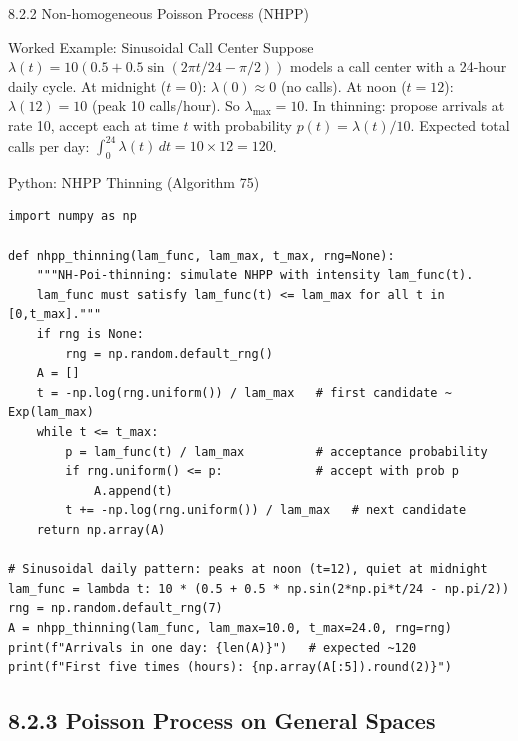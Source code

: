 \documentclass[aspectratio=169,10pt]{beamer}
\begin{document}
\begin{frame}[allowframebreaks]{8.2.2 Non-homogeneous Poisson Process (NHPP)}
\begin{exampleblock}{Worked Example: Sinusoidal Call Center}
Suppose $\lambda(t) = 10(0.5 + 0.5\sin(2\pi t/24 - \pi/2))$ models a call
center with a 24-hour daily cycle.  At midnight ($t=0$): $\lambda(0) \approx 0$
(no calls).  At noon ($t=12$): $\lambda(12) = 10$ (peak 10 calls/hour).  So
$\lambda_{\max} = 10$.  In thinning: propose arrivals at rate 10, accept each at
time $t$ with probability $p(t) = \lambda(t)/10$.  Expected total calls per day:
$\int_0^{24}\lambda(t)\,dt = 10 \times 12 = 120$.
\end{exampleblock}

\end{frame}

\begin{frame}[fragile]{Python: NHPP Thinning (Algorithm 75)}
\begin{lstlisting}[style=python]
import numpy as np

def nhpp_thinning(lam_func, lam_max, t_max, rng=None):
    """NH-Poi-thinning: simulate NHPP with intensity lam_func(t).
    lam_func must satisfy lam_func(t) <= lam_max for all t in [0,t_max]."""
    if rng is None:
        rng = np.random.default_rng()
    A = []
    t = -np.log(rng.uniform()) / lam_max   # first candidate ~ Exp(lam_max)
    while t <= t_max:
        p = lam_func(t) / lam_max          # acceptance probability
        if rng.uniform() <= p:             # accept with prob p
            A.append(t)
        t += -np.log(rng.uniform()) / lam_max   # next candidate
    return np.array(A)

# Sinusoidal daily pattern: peaks at noon (t=12), quiet at midnight
lam_func = lambda t: 10 * (0.5 + 0.5 * np.sin(2*np.pi*t/24 - np.pi/2))
rng = np.random.default_rng(7)
A = nhpp_thinning(lam_func, lam_max=10.0, t_max=24.0, rng=rng)
print(f"Arrivals in one day: {len(A)}")   # expected ~120
print(f"First five times (hours): {np.array(A[:5]).round(2)}")
\end{lstlisting}
\end{frame}

\subsection{8.2.3 Poisson Process on General Spaces}
\end{document}
